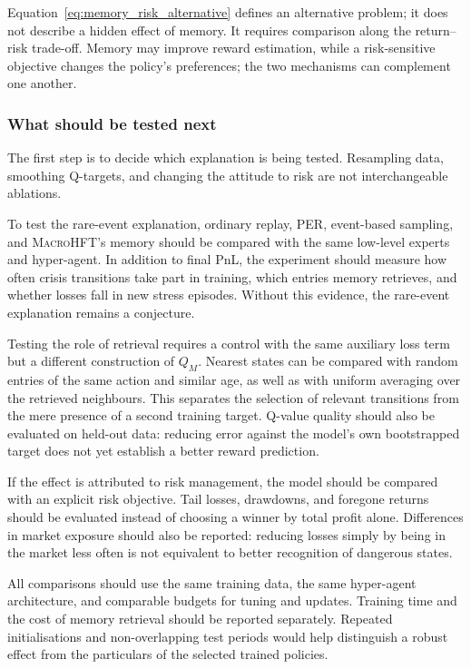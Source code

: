 \documentclass[9pt,a4paper,twocolumn]{extarticle}
\newcommand{\Macro}{\textsc{MacroHFT}}
\begin{document}
Equation~\eqref{eq:memory_risk_alternative} defines an alternative problem; it does not describe
a hidden effect of memory. It requires comparison along the return--risk trade-off. Memory may
improve reward estimation, while a risk-sensitive objective changes the policy's preferences;
the two mechanisms can complement one another.

\subsubsection{What should be tested next}

The first step is to decide which explanation is being tested. Resampling data, smoothing
Q-targets, and changing the attitude to risk are not interchangeable ablations.

To test the rare-event explanation, ordinary replay, PER, event-based sampling, and \Macro{}'s
memory should be compared with the same low-level experts and hyper-agent. In addition to final
PnL, the experiment should measure how often crisis transitions take part in training, which
entries memory retrieves, and whether losses fall in new stress episodes. Without this evidence,
the rare-event explanation remains a conjecture.

Testing the role of retrieval requires a control with the same auxiliary loss term but a different
construction of $Q_M$. Nearest states can be compared with random entries of the same action and
similar age, as well as with uniform averaging over the retrieved neighbours. This separates the
selection of relevant transitions from the mere presence of a second training target. Q-value
quality should also be evaluated on held-out data: reducing error against the model's own
bootstrapped target does not yet establish a better reward prediction.

If the effect is attributed to risk management, the model should be compared with an explicit
risk objective. Tail losses, drawdowns, and foregone returns should be evaluated instead of
choosing a winner by total profit alone. Differences in market exposure should also be reported:
reducing losses simply by being in the market less often is not equivalent to better recognition
of dangerous states.

All comparisons should use the same training data, the same hyper-agent architecture, and
comparable budgets for tuning and updates. Training time and the cost of memory retrieval should
be reported separately. Repeated initialisations and non-overlapping test periods would help
distinguish a robust effect from the particulars of the selected trained policies.
\end{document}
